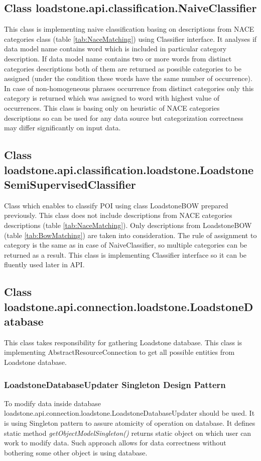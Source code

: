 \subsection{Class \newline loadstone.api.classification.NaiveClassifier}
\label{naive_classifier}
This class is implementing naive classification basing on descriptions from NACE categories class (table \ref{tab:NaceMatching}) using Classifier interface. It analyses if data model name contains word which is included in particular category description. If data model name contains two or more words from distinct categories descriptions both of them are returned as possible categories to be assigned (under the condition these words have the same number of occurrence). In case of non-homogeneous phrases occurrence from distinct categories only this category is returned which was assigned to word with highest value of occurrences. This class is basing only on heuristic of NACE categories descriptions so can be used for any data source but categorization correctness may differ significantly on input data. 

\subsection{Class \newline loadstone.api.classification.loadstone.\newline LoadstoneSemiSupervisedClassifier}
\label{semi_desc}
Class which enables to classify POI using class LoadstoneBOW prepared previously. This class does not include descriptions from NACE categories descriptions (table \ref{tab:NaceMatching}). Only descriptions from LoadstoneBOW (table \ref{tab:BowMatching}) are taken into consideration. The rule of assignment to category is the same as in case of NaiveClassifier, so multiple categories can be returned as a result. This class is implementing Classifier interface so it can be fluently used later in API.

\subsection{Class \newline loadstone.api.connection.loadstone.LoadstoneDatabase}
This class takes responsibility for gathering Loadstone database. This class is implementing AbstractResourceConnection to get all possible entities from Loadstone database. 

\subsubsection{LoadstoneDatabaseUpdater Singleton Design Pattern}
To modify data inside database loadstone.api.connection.loadstone.LoadstoneDatabaseUpdater should be used. It is using Singleton pattern to assure atomicity of operation on database. It defines static method \textit{getObjectModelSingleton()} returns static object on which user can work to modify data. Such approach allows for data correctness without bothering some other object is using database.  


